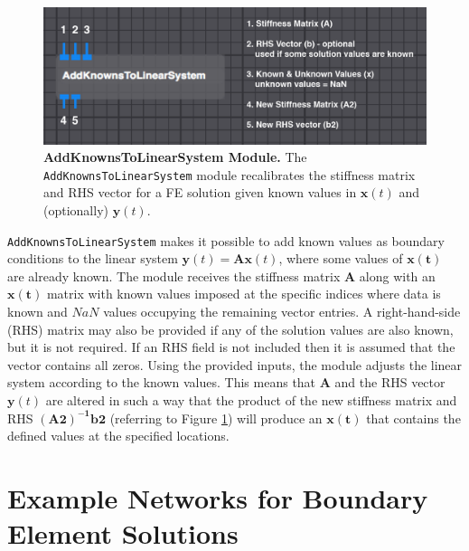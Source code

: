 \begin{figure}[b]
\begin{center}
\includegraphics[width=\textwidth]{ECGToolkitGuide_figures/AddKnowns.png}
\caption{{\bf AddKnownsToLinearSystem Module.} The {\tt AddKnownsToLinearSystem} module recalibrates  the stiffness matrix and RHS vector for a FE solution given known values in $\mathbf{x}(t)$ and (optionally) $\mathbf{y}(t)$.}
\label{fig:AddKnowns}
\end{center}
\vspace{-.25 in}
\end{figure}

{\tt AddKnownsToLinearSystem} makes it possible to add known values as boundary conditions
to the linear system $\mathbf{y}(t) = \mathbf{A}\mathbf{x}(t)$, where some values of
$\mathbf{x(t)}$ are already known.
The module receives the stiffness matrix $\mathbf{A}$ along with an $\mathbf{x(t)}$ matrix with known values imposed at the specific indices where data is known and $NaN$ values occupying the remaining vector entries.
A right-hand-side (RHS) matrix may also be provided if any of the solution values are also known, but it is not required.
If an RHS field is not included then it is assumed that the vector contains all zeros. %
Using the provided inputs, the module adjusts the linear system according to the known values.
This means that $\mathbf{A}$ and the RHS vector $\mathbf{y}(t)$ are altered in such a way that the product of the new stiffness matrix and RHS $\mathbf{(A2)^{-1}} \mathbf{b2}$ (referring to Figure \ref{fig:AddKnowns}) will produce an $\mathbf{x(t)}$ that contains the defined values at the specified locations.

\section{Example Networks for Boundary Element Solutions}

